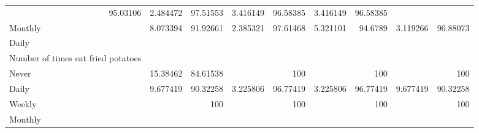 \documentclass{article}
\begin{document}
\begin{table}[!h]
{\begin{tabular}{lllllllll}
				\multicolumn{1}{r}{95.03106} &
				\multicolumn{1}{r}{2.484472} &
				\multicolumn{1}{r}{97.51553} &
				\multicolumn{1}{r}{3.416149} &
				\multicolumn{1}{r}{96.58385} &
				\multicolumn{1}{r}{3.416149} &
				\multicolumn{1}{r}{96.58385} \\
				\multicolumn{1}{l}{\hspace{5em}Monthly} &
				\multicolumn{1}{|r}{8.073394} &
				\multicolumn{1}{r}{91.92661} &
				\multicolumn{1}{r}{2.385321} &
				\multicolumn{1}{r}{97.61468} &
				\multicolumn{1}{r}{5.321101} &
				\multicolumn{1}{r}{94.6789} &
				\multicolumn{1}{r}{3.119266} &
				\multicolumn{1}{r}{96.88073} \\
				\multicolumn{1}{l}{\hspace{3em}Daily} &
				\multicolumn{1}{|r}{} &
				\multicolumn{1}{r}{} &
				\multicolumn{1}{r}{} &
				\multicolumn{1}{r}{} &
				\multicolumn{1}{r}{} &
				\multicolumn{1}{r}{} &
				\multicolumn{1}{r}{} &
				\multicolumn{1}{r}{} \\
				\multicolumn{1}{l}{\hspace{4em}Number of times eat fried potatoes} &
				\multicolumn{1}{|r}{} &
				\multicolumn{1}{r}{} &
				\multicolumn{1}{r}{} &
				\multicolumn{1}{r}{} &
				\multicolumn{1}{r}{} &
				\multicolumn{1}{r}{} &
				\multicolumn{1}{r}{} &
				\multicolumn{1}{r}{} \\
				\multicolumn{1}{l}{\hspace{5em}Never} &
				\multicolumn{1}{|r}{15.38462} &
				\multicolumn{1}{r}{84.61538} &
				\multicolumn{1}{r}{} &
				\multicolumn{1}{r}{100} &
				\multicolumn{1}{r}{} &
				\multicolumn{1}{r}{100} &
				\multicolumn{1}{r}{} &
				\multicolumn{1}{r}{100} \\
				\multicolumn{1}{l}{\hspace{5em}Daily} &
				\multicolumn{1}{|r}{9.677419} &
				\multicolumn{1}{r}{90.32258} &
				\multicolumn{1}{r}{3.225806} &
				\multicolumn{1}{r}{96.77419} &
				\multicolumn{1}{r}{3.225806} &
				\multicolumn{1}{r}{96.77419} &
				\multicolumn{1}{r}{9.677419} &
				\multicolumn{1}{r}{90.32258} \\
				\multicolumn{1}{l}{\hspace{5em}Weekly} &
				\multicolumn{1}{|r}{} &
				\multicolumn{1}{r}{100} &
				\multicolumn{1}{r}{} &
				\multicolumn{1}{r}{100} &
				\multicolumn{1}{r}{} &
				\multicolumn{1}{r}{100} &
				\multicolumn{1}{r}{} &
				\multicolumn{1}{r}{100} \\
				\multicolumn{1}{l}{\hspace{5em}Monthly} &

\end{tabular}}
\end{table}
\end{document}

